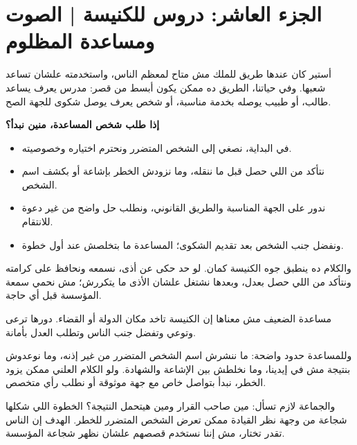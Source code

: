 \documentclass[12pt,a4paper]{article}
\begin{document}
\section*{الجزء العاشر: دروس للكنيسة | الصوت ومساعدة المظلوم}
أستير كان عندها طريق للملك مش متاح لمعظم الناس، واستخدمته علشان تساعد شعبها. وفي حياتنا، الطريق ده ممكن يكون أبسط من قصر: مدرس يعرف يساعد طالب، أو طبيب يوصله بخدمة مناسبة، أو شخص يعرف يوصل شكوى للجهة الصح.\par\medskip
\vspace{0.2em}\noindent\textcolor{ochre}{\textbf{إذا طلب شخص المساعدة، منين نبدأ؟}}\par\smallskip
\begin{itemize}[rightmargin=1.2em,leftmargin=0.5em,itemsep=0.25em,topsep=0.2em]
\item في البداية، نصغي إلى الشخص المتضرر ونحترم اختياره وخصوصيته.
\item نتأكد من اللي حصل قبل ما ننقله، وما نزودش الخطر بإشاعة أو بكشف اسم الشخص.
\item ندور على الجهة المناسبة والطريق القانوني، ونطلب حل واضح من غير دعوة للانتقام.
\item ونفضل جنب الشخص بعد تقديم الشكوى؛ المساعدة ما بتخلصش عند أول خطوة.
\end{itemize}\medskip
والكلام ده ينطبق جوه الكنيسة كمان. لو حد حكى عن أذى، نسمعه ونحافظ على كرامته ونتأكد من اللي حصل بعدل، وبعدها نشتغل علشان الأذى ما يتكررش؛ مش نحمي سمعة المؤسسة قبل أي حاجة.\par\medskip
مساعدة الضعيف مش معناها إن الكنيسة تاخد مكان الدولة أو القضاء. دورها ترعى وتوعي وتفضل جنب الناس وتطلب العدل بأمانة.\par\medskip
وللمساعدة حدود واضحة: ما ننشرش اسم الشخص المتضرر من غير إذنه، وما نوعدوش بنتيجة مش في إيدينا، وما نخلطش بين الإشاعة والشهادة. ولو الكلام العلني ممكن يزود الخطر، نبدأ بتواصل خاص مع جهة موثوقة أو نطلب رأي متخصص.\par\medskip
والجماعة لازم تسأل: مين صاحب القرار ومين هيتحمل النتيجة؟ الخطوة اللي شكلها شجاعة من وجهة نظر القيادة ممكن تعرض الشخص المتضرر للخطر. الهدف إن الناس تقدر تختار، مش إننا نستخدم قصصهم علشان نظهر شجاعة المؤسسة.\par\medskip
\clearpage
\clearpage
\end{document}

